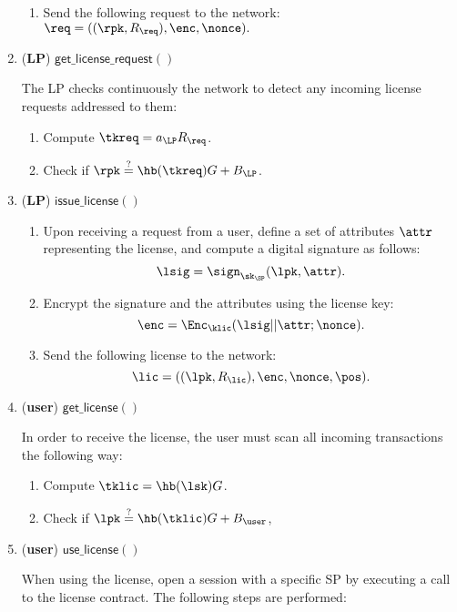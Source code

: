 \begin{enumerate}
\begin{enumerate}
		\item Send the following request to the network: $\req = ((\rpk, R_{\req}), \enc, \nonce).$
		
	\end{enumerate}


\item (\textbf{LP}) $\mathsf{get\_license\_request()}$

	The LP checks continuously the network to detect any incoming license requests addressed to them:
	
	\begin{enumerate}
		\item Compute $\tkreq = a_{\LP}R_{\req}$.
		\item Check if $\rpk \stackrel{?}{=} \hb(\tkreq) G + B_{\LP}$.
	\end{enumerate}

\item (\textbf{LP}) $\mathsf{issue\_license()}$
	
	\begin{enumerate}
		\item Upon receiving a request from a user, define a set of attributes $\attr$ representing the license, and compute a digital signature as follows:
				$$\lsig = \sign_{\sk_{\SP}}(\lpk, \attr).$$
		\item Encrypt the signature and the attributes using the license key:
			  	$$\enc = \Enc_{\klic} (\lsig || \attr; \nonce).$$
		\item Send the following license to the network:
				$$\lic = ((\lpk, R_{\lic}), \enc, \nonce, \pos).$$
	\end{enumerate}
	
\item (\textbf{user}) $\mathsf{get\_license()}$

	In order to receive the license, the user must scan all incoming transactions the following way:
	
	\begin{enumerate}
		\item Compute $\tklic = \hb(\lsk)G$.
		\item Check if $\lpk \stackrel{?}{=} \hb(\tklic) G + B_{\user}$, 
	\end{enumerate}	
	
\item (\textbf{user}) $\mathsf{use\_license()}$

	When using the license, open a session with a specific SP by executing a call to the license contract. The following steps are performed:
	

\end{enumerate}
